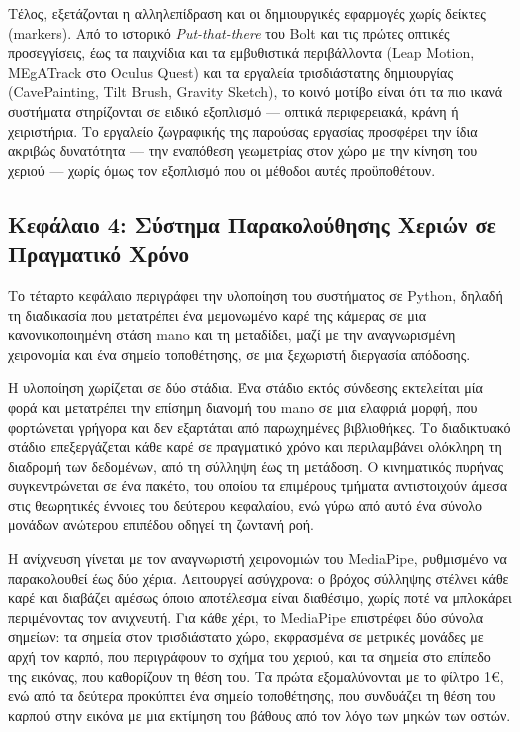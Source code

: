Τέλος, εξετάζονται η αλληλεπίδραση και οι δημιουργικές εφαρμογές χωρίς δείκτες
(markers). Από το ιστορικό \emph{Put-that-there} του Bolt και τις πρώτες
οπτικές προσεγγίσεις, έως τα παιχνίδια και τα εμβυθιστικά περιβάλλοντα (Leap
Motion, MEgATrack στο Oculus Quest) και τα εργαλεία τρισδιάστατης δημιουργίας
(CavePainting, Tilt Brush, Gravity Sketch), το κοινό μοτίβο είναι ότι τα πιο
ικανά συστήματα στηρίζονται σε ειδικό εξοπλισμό --- οπτικά περιφερειακά, κράνη
ή χειριστήρια. Το εργαλείο ζωγραφικής της παρούσας εργασίας προσφέρει την ίδια
ακριβώς δυνατότητα --- την εναπόθεση γεωμετρίας στον χώρο με την κίνηση του
χεριού --- χωρίς όμως τον εξοπλισμό που οι μέθοδοι αυτές προϋποθέτουν.



\subsection*{Κεφάλαιο 4: Σύστημα Παρακολούθησης Χεριών σε Πραγματικό Χρόνο}

Το τέταρτο κεφάλαιο περιγράφει την υλοποίηση του συστήματος σε Python, δηλαδή
τη διαδικασία που μετατρέπει ένα μεμονωμένο καρέ της κάμερας σε μια
κανονικοποιημένη στάση \acrshort{mano} και τη μεταδίδει, μαζί με την
αναγνωρισμένη χειρονομία και ένα σημείο τοποθέτησης, σε μια ξεχωριστή διεργασία
απόδοσης.

Η υλοποίηση χωρίζεται σε δύο στάδια. Ένα στάδιο εκτός σύνδεσης εκτελείται μία
φορά και μετατρέπει την επίσημη διανομή του \acrshort{mano} σε μια ελαφριά
μορφή, που φορτώνεται γρήγορα και δεν εξαρτάται από παρωχημένες βιβλιοθήκες. Το
διαδικτυακό στάδιο επεξεργάζεται κάθε καρέ σε πραγματικό χρόνο και περιλαμβάνει
ολόκληρη τη διαδρομή των δεδομένων, από τη σύλληψη έως τη μετάδοση. Ο
κινηματικός πυρήνας συγκεντρώνεται σε ένα πακέτο, του οποίου τα επιμέρους
τμήματα αντιστοιχούν άμεσα στις θεωρητικές έννοιες του δεύτερου κεφαλαίου, ενώ
γύρω από αυτό ένα σύνολο μονάδων ανώτερου επιπέδου οδηγεί τη ζωντανή ροή.

Η ανίχνευση γίνεται με τον αναγνωριστή χειρονομιών του MediaPipe, ρυθμισμένο να
παρακολουθεί έως δύο χέρια. Λειτουργεί ασύγχρονα: ο βρόχος σύλληψης στέλνει
κάθε καρέ και διαβάζει αμέσως όποιο αποτέλεσμα είναι διαθέσιμο, χωρίς ποτέ να
μπλοκάρει περιμένοντας τον ανιχνευτή. Για κάθε χέρι, το MediaPipe επιστρέφει
δύο σύνολα σημείων: τα σημεία στον τρισδιάστατο χώρο, εκφρασμένα σε μετρικές
μονάδες με αρχή τον καρπό, που περιγράφουν το σχήμα του χεριού, και τα σημεία
στο επίπεδο της εικόνας, που καθορίζουν τη θέση του. Τα πρώτα εξομαλύνονται με
το φίλτρο 1\euro{}, ενώ από τα δεύτερα προκύπτει ένα σημείο τοποθέτησης, που
συνδυάζει τη θέση του καρπού στην εικόνα με μια εκτίμηση του βάθους από τον
λόγο των μηκών των οστών.

